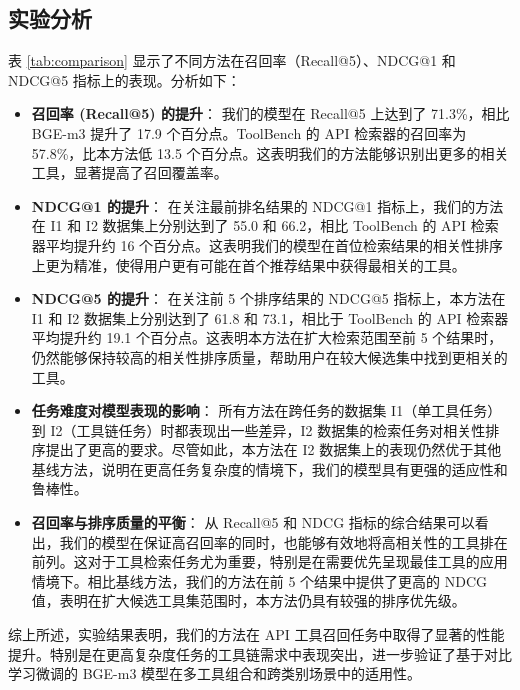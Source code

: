 \subsection{实验分析}

表 \ref{tab:comparison} 显示了不同方法在召回率（Recall@5）、NDCG@1 和 NDCG@5 指标上的表现。分析如下：

\begin{itemize}
    \item \textbf{召回率 (Recall@5) 的提升}：
    我们的模型在 Recall@5 上达到了 71.3\%，相比 BGE-m3 提升了 17.9 个百分点。ToolBench 的 API 检索器的召回率为 57.8\%，比本方法低 13.5 个百分点。这表明我们的方法能够识别出更多的相关工具，显著提高了召回覆盖率。

    \item \textbf{NDCG@1 的提升}：
    在关注最前排名结果的 NDCG@1 指标上，我们的方法在 I1 和 I2 数据集上分别达到了 55.0 和 66.2，相比 ToolBench 的 API 检索器平均提升约 16 个百分点。这表明我们的模型在首位检索结果的相关性排序上更为精准，使得用户更有可能在首个推荐结果中获得最相关的工具。

    \item \textbf{NDCG@5 的提升}：
    在关注前 5 个排序结果的 NDCG@5 指标上，本方法在 I1 和 I2 数据集上分别达到了 61.8 和 73.1，相比于 ToolBench 的 API 检索器平均提升约 19.1 个百分点。这表明本方法在扩大检索范围至前 5 个结果时，仍然能够保持较高的相关性排序质量，帮助用户在较大候选集中找到更相关的工具。

    \item \textbf{任务难度对模型表现的影响}：
    所有方法在跨任务的数据集 I1（单工具任务）到 I2（工具链任务）时都表现出一些差异，I2 数据集的检索任务对相关性排序提出了更高的要求。尽管如此，本方法在 I2 数据集上的表现仍然优于其他基线方法，说明在更高任务复杂度的情境下，我们的模型具有更强的适应性和鲁棒性。

    \item \textbf{召回率与排序质量的平衡}：
    从 Recall@5 和 NDCG 指标的综合结果可以看出，我们的模型在保证高召回率的同时，也能够有效地将高相关性的工具排在前列。这对于工具检索任务尤为重要，特别是在需要优先呈现最佳工具的应用情境下。相比基线方法，我们的方法在前 5 个结果中提供了更高的 NDCG 值，表明在扩大候选工具集范围时，本方法仍具有较强的排序优先级。

\end{itemize}

综上所述，实验结果表明，我们的方法在 API 工具召回任务中取得了显著的性能提升。特别是在更高复杂度任务的工具链需求中表现突出，进一步验证了基于对比学习微调的 BGE-m3 模型在多工具组合和跨类别场景中的适用性。

